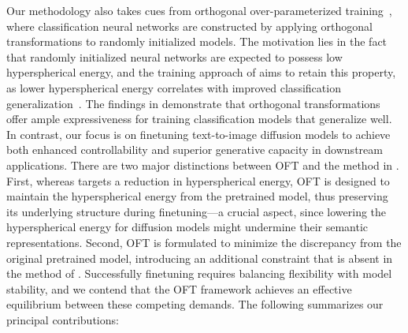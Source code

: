 Our methodology also takes cues from orthogonal over-parameterized training~\cite{liu2021orthogonal}, where classification neural networks are constructed by applying orthogonal transformations to randomly initialized models. The motivation lies in the fact that randomly initialized neural networks are expected to possess low hyperspherical energy, and the training approach of \cite{liu2021orthogonal} aims to retain this property, as lower hyperspherical energy correlates with improved classification generalization~\cite{liu2018learning,lin2020regularizing}. The findings in \cite{liu2021orthogonal} demonstrate that orthogonal transformations offer ample expressiveness for training classification models that generalize well. In contrast, our focus is on finetuning text-to-image diffusion models to achieve both enhanced controllability and superior generative capacity in downstream applications. There are two major distinctions between OFT and the method in \cite{liu2021orthogonal}. First, whereas \cite{liu2021orthogonal} targets a reduction in hyperspherical energy, OFT is designed to maintain the hyperspherical energy from the pretrained model, thus preserving its underlying structure during finetuning—a crucial aspect, since lowering the hyperspherical energy for diffusion models might undermine their semantic representations. Second, OFT is formulated to minimize the discrepancy from the original pretrained model, introducing an additional constraint that is absent in the method of \cite{liu2021orthogonal}. Successfully finetuning requires balancing flexibility with model stability, and we contend that the OFT framework achieves an effective equilibrium between these competing demands. The following summarizes our principal contributions:

